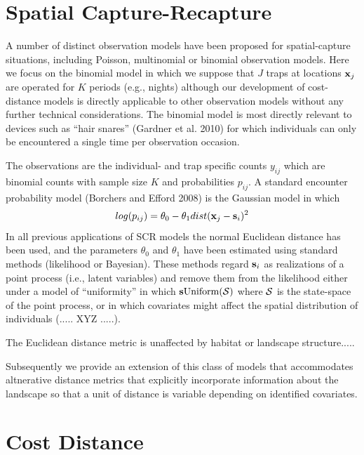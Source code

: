 \section{Spatial Capture-Recapture}

A number of distinct observation models have been proposed for
spatial-capture situations, including Poisson, multinomial or binomial
observation models. Here we focus on the binomial model in
which we suppose that $J$ traps at locations ${\bf x}_{j}$ are
operated for $K$ periods (e.g., nights) although our development of
cost-distance models is directly applicable to other observation
models without any further technical considerations. The binomial
model is most directly relevant to devices such as ``hair snares''
(Gardner et al. 2010) for which individuals can only be encountered a
single time per observation occasion. 

The observations are the
individual- and trap specific counts $y_{ij}$ which are binomial
counts with sample size $K$ and probabilities $p_{ij}$. A standard
encounter probability model (Borchers and Efford 2008) is the Gaussian model in which 
\[
log(p_{ij})= \theta_{0} - \theta_{1} dist({\bf x}_{j} - {\bf s}_{i})^{2}
\]
In all previous applications of SCR models the normal Euclidean
distance has been used, and the parameters $\theta_0$ and $\theta_1$
have been estimated using standard methods (likelihood or
Bayesian). These methods regard ${\bf s}_{i}$ as realizations of a
point process (i.e., latent variables) and remove them from the
likelihood either under a model of ``uniformity'' in which ${\bf s}
\mbox{Uniform}({\cal S})$ where ${\cal S}$ is the state-space of the
point process, or in which covariates might affect the spatial
distribution of individuals (..... XYZ .....).

The Euclidean distance metric is unaffected by habitat or landscape
structure.....

Subsequently we provide an extension of this class of models that
accommodates altnerative distance metrics that explicitly incorporate
information about the landscape so that a unit of distance is variable
depending on identified covariates. 

\section{Cost Distance}

